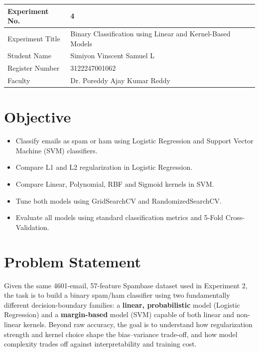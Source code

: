 \documentclass[12pt,a4paper]{article}
\begin{document}
\begin{tabular}{|p{4cm}|p{11cm}|}
\hline
Experiment No. & 4 \\ \hline
Experiment Title & Binary Classification using Linear and Kernel-Based Models\footnotemark\\ \hline
Student Name & Simiyon Vinscent Samuel L \\ \hline
Register Number & 3122247001062 \\ \hline
Faculty & Dr. Poreddy Ajay Kumar Reddy \\ \hline
\end{tabular}

\section{Objective}
\begin{itemize}[nosep]
\item Classify emails as spam or ham using Logistic Regression and Support Vector Machine
(SVM) classifiers.
\item Compare L1 and L2 regularization in Logistic Regression.
\item Compare Linear, Polynomial, RBF and Sigmoid kernels in SVM.
\item Tune both models using GridSearchCV and RandomizedSearchCV.
\item Evaluate all models using standard classification metrics and 5-Fold Cross-Validation.
\end{itemize}

\section{Problem Statement}
Given the same 4601-email, 57-feature Spambase dataset used in Experiment 2, the task is
to build a binary spam/ham classifier using two fundamentally different decision-boundary
families: a \textbf{linear, probabilistic} model (Logistic Regression) and a
\textbf{margin-based} model (SVM) capable of both linear and non-linear kernels. Beyond
raw accuracy, the goal is to understand how regularization strength and kernel choice
shape the bias--variance trade-off, and how model complexity trades off against
interpretability and training cost.
\end{document}
